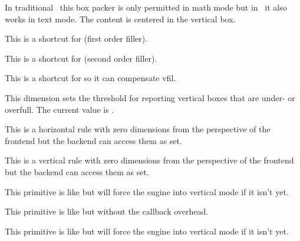 In traditional \TEX\ this box packer is only permitted in math mode but in
\LUAMETATEX\ it also works in text mode. The content is centered in the vertical
box.

\stopoldprimitive

\startoldprimitive[title={\prm {vfil}}]

This is a shortcut for  (first order filler).

\stopoldprimitive

\startoldprimitive[title={\prm {vfill}}]

This is a shortcut for  (second order filler).

\stopoldprimitive

\startoldprimitive[title={\prm {vfilneg}}]

This is a shortcut for  so it can compensate \prm
{vfil}.

\stopoldprimitive

\startoldprimitive[title={\prm {vfuzz}}]

This dimension sets the threshold for reporting vertical boxes that are under- or
overfull. The current value is \the \vfuzz.

\stopoldprimitive

\startnewprimitive[title={\prm {virtualhrule}}]

This is a horizontal rule with zero dimensions from the perspective of the
frontend but the backend can access them as set.

\stopnewprimitive

\startnewprimitive[title={\prm {virtualvrule}}]

This is a vertical rule with zero dimensions from the perspective of the frontend
but the backend can access them as set.

\stopnewprimitive

\startoldprimitive[title={\prm {vkern}}]

This primitive is like  but will force the engine into vertical mode
if it isn't yet.

\stopoldprimitive

\startnewprimitive[title={\prm {vpack}}]

This primitive is like  but without the callback overhead.

\stopnewprimitive

\startnewprimitive[title={\prm {vpenalty}}]

This primitive is like  but will force the engine into vertical
mode if it isn't yet.

